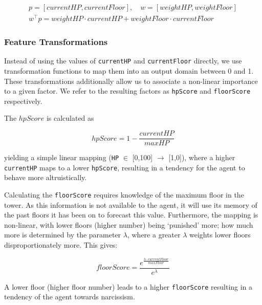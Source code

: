 \begin{equation}
    \begin{gathered}
    p = [\mathit{currentHP, currentFloor}],\quad w=[\mathit{weightHP, weightFloor}] \\ 
    w^\top{}p = \mathit{weightHP \cdot currentHP + weightFloor \cdot currentFloor}
    \end{gathered}
\end{equation}



\subsubsection{Feature Transformations} \label{sec:featTran}

Instead of using the values of \texttt{currentHP} and \texttt{currentFloor} directly, we use transformation functions to map them into an output domain between 0 and 1. These transformations additionally allow us to associate a non-linear importance to a given factor. We refer to the resulting factors as \texttt{hpScore} and \texttt{floorScore} respectively.

The $hpScore$ is calculated as

\begin{equation}
    \mathit{hpScore} = 1 - \frac{\mathit{currentHP}}{\mathit{maxHP}}
\end{equation}

yielding a simple linear mapping (\texttt{HP} $\in$ [0,100] $\rightarrow$ [1,0]), where a higher \texttt{currentHP} maps to a lower \texttt{hpScore}, resulting in a tendency for the agent to behave more altruistically.

Calculating the \texttt{floorScore} requires knowledge of the maximum floor in the tower. As this information is not available to the agent, it will use its memory of the past floors it has been on to forecast this value. Furthermore, the mapping is non-linear, with lower floors (higher number) being `punished' more; how much more is determined by the parameter $\lambda$, where a greater $\lambda$ weights lower floors disproportionately more. This gives:

\begin{equation}
    \mathit{floorScore} = \frac{e^{\frac{\lambda\cdot \mathit{currentFloor}}{\mathit{maxFloor}}}}{e^{\lambda}}
\end{equation}

A lower floor (higher floor number) leads to a higher \texttt{floorScore} resulting in a tendency of the agent towards narcissism.

